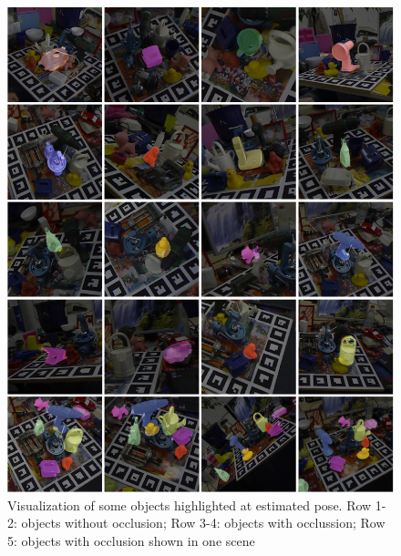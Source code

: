 \documentclass[12pt,DIV14,BCOR12mm,a4paper,footinclude=false,headinclude,parskip=half-,twoside,openright,cleardoublepage=empty,toc=index,bibliography=totoc,listof=totoc]{scrreprt}
\numberwithin{equation}{chapter}
\begin{document}
\begin{figure}[H]
	\centering
	\includegraphics[width=1.\textwidth]{img/vis_all.pdf}
	\caption{Visualization of some objects highlighted at estimated pose. Row 1-2: objects without occlusion; Row 3-4: objects with occlussion; Row 5: objects with occlusion shown in one scene}
	\label{img:vis_all}
\end{figure}
\end{document}
